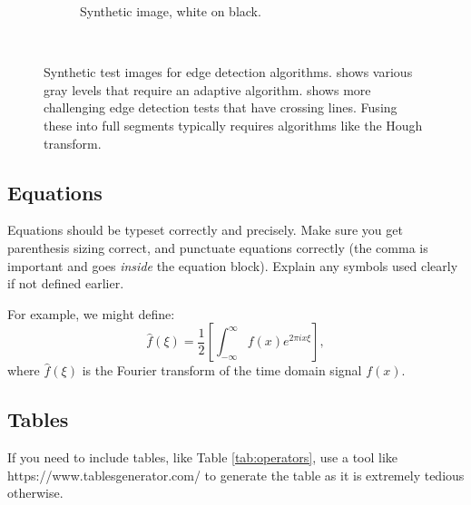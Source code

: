 \documentclass{l4proj}
\begin{document}
\begin{figure}
\begin{subfigure}[b]{0.45\textwidth}
        \caption{Synthetic image, white on black.}
        \label{fig:syn2}
    \end{subfigure}
    ~ %
    \caption{Synthetic test images for edge detection algorithms.  shows various gray levels that require an adaptive algorithm. 
    shows more challenging edge detection tests that have crossing lines. Fusing these into full segments typically requires algorithms like the Hough transform.
    }\label{fig:synthetic}
\end{figure}

\clearpage

\subsection{Equations}

Equations should be typeset correctly and precisely. Make sure you get parenthesis sizing correct, and punctuate equations correctly 
(the comma is important and goes \textit{inside} the equation block). Explain any symbols used clearly if not defined earlier. 

For example, we might define:
\begin{equation}
    \hat{f}(\xi) = \frac{1}{2}\left[ \int_{-\infty}^{\infty} f(x) e^{2\pi i x \xi} \right],
\end{equation}    
where $\hat{f}(\xi)$ is the Fourier transform of the time domain signal $f(x)$.


\subsection{Tables}

If you need to include tables, like Table \ref{tab:operators}, use a tool like https://www.tablesgenerator.com/ to generate the table as it is
extremely tedious otherwise. 
\end{document}
